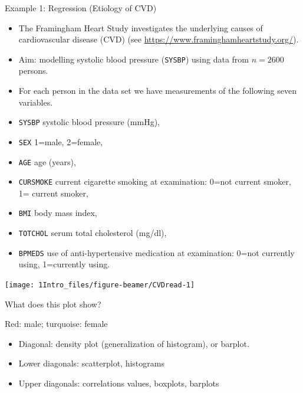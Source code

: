 \documentclass[10pt,ignorenonframetext,]{beamer}
\providecommand{\tightlist}{%
  \setlength{\itemsep}{0pt}\setlength{\parskip}{0pt}}
\begin{document}
\begin{frame}[fragile]{Example 1: Regression (Etiology of CVD)}

\begin{itemize}
\item
  The Framingham Heart Study investigates the underlying causes of
  cardiovascular disease (CVD) (see
  \url{https://www.framinghamheartstudy.org/}). 
\item
  Aim: modelling systolic blood pressure (\texttt{SYSBP}) using data
  from \(n=2600\) persons.
\item
  For each person in the data set we have measurements of the following
  seven variables.
\end{itemize}

\scriptsize

\begin{itemize}
\tightlist
\item
  \texttt{SYSBP} systolic blood pressure (mmHg),
\item
  \texttt{SEX} 1=male, 2=female,
\item
  \texttt{AGE} age (years),
\item
  \texttt{CURSMOKE} current cigarette smoking at examination: 0=not
  current smoker, 1= current smoker,
\item
  \texttt{BMI} body mass index,
\item
  \texttt{TOTCHOL} serum total cholesterol (mg/dl),
\item
  \texttt{BPMEDS} use of anti-hypertensive medication at examination:
  0=not currently using, 1=currently using. \normalsize
\end{itemize}

\end{frame}

\begin{frame}

\begin{center}\texttt{[image: 1Intro\_files/figure-beamer/CVDread-1]} \end{center}

What does this plot show?

Red: male; turquoise: female

\end{frame}

\begin{frame}

\begin{itemize}
\tightlist
\item
  Diagonal: density plot (generalization of histogram), or barplot.
\item
  Lower diagonals: scatterplot, histograms
\item
  Upper diagonals: correlations values, boxplots, barplots
\end{itemize}

\end{frame}
\end{document}
